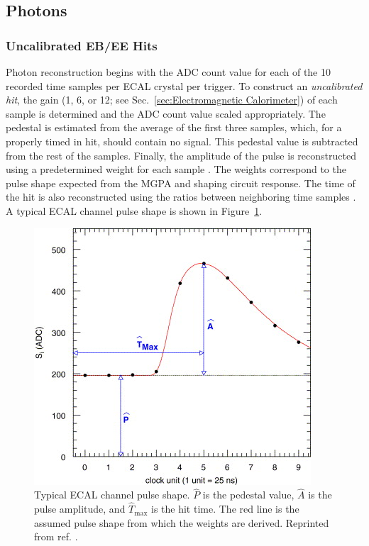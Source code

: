\documentclass[dissertation.tex]{subfiles}
\begin{document}
\subsection{Photons}
\label{sec:Photons}

\subsubsection{Uncalibrated EB/EE Hits}
\label{sec:Uncalibrated EB/EE Hits}

Photon reconstruction begins with the ADC count value for each of the 10 recorded time samples per ECAL crystal per trigger.  To construct an \textit{uncalibrated hit}, the gain (1, 6, or 12; see Sec.~\ref{sec:Electromagnetic Calorimeter}) of each sample is determined and the ADC count value scaled appropriately.  The pedestal is estimated from the average of the first three samples, which, for a properly timed in hit, should contain no signal.  This pedestal value is subtracted from the rest of the samples.  Finally, the amplitude of the pulse is reconstructed using a predetermined weight for each sample \cite{Bruneliere}.  The weights correspond to the pulse shape expected from the MGPA and shaping circuit response.  The time of the hit is also reconstructed using the ratios between neighboring time samples \cite{time_reco}.  A typical ECAL channel pulse shape is shown in Figure~\ref{fig:pulse}.

\begin{figure}
	\centering
	\includegraphics[scale=2.0]{pulse}
	\caption{Typical ECAL channel pulse shape.  $\widehat{P}$ is the pedestal value, $\widehat{A}$ is the pulse amplitude, and $\widehat{T}_{\mathrm{max}}$ is the hit time.  The red line is the assumed pulse shape from which the weights are derived.  Reprinted from ref. \cite{Bruneliere}.}
	\label{fig:pulse}
\end{figure}
\end{document}
